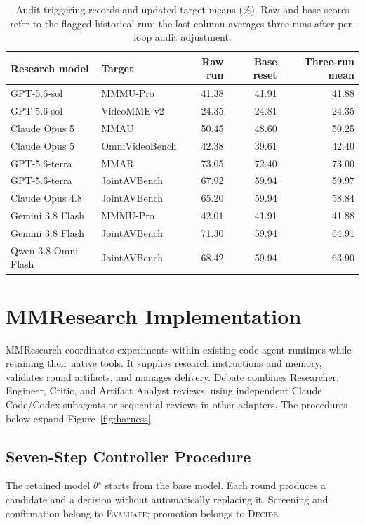 %
%
\begin{table}[!htbp]
\miletablestyle

\caption{Audit-triggering records and updated target means (\%). Raw and base scores refer to the flagged historical run; the last column averages three runs after per-loop audit adjustment.}\label{tab:resets}
\begin{tabular*}{\linewidth}{@{\extracolsep{\fill}}llrrr@{}}
\toprule
Research model & Target & Raw run & Base reset & Three-run mean \\
\midrule
GPT-5.6-sol & MMMU-Pro & 41.38 & 41.91 & 41.88 \\
GPT-5.6-sol & VideoMME-v2 & 24.35 & 24.81 & 24.35 \\
Claude Opus 5 & MMAU & 50.45 & 48.60 & 50.25 \\
Claude Opus 5 & OmniVideoBench & 42.38 & 39.61 & 42.40 \\
GPT-5.6-terra & MMAR & 73.05 & 72.40 & 73.00 \\
GPT-5.6-terra & JointAVBench & 67.92 & 59.94 & 59.97 \\
Claude Opus 4.8 & JointAVBench & 65.20 & 59.94 & 58.84 \\
Gemini 3.8 Flash & MMMU-Pro & 42.01 & 41.91 & 41.88 \\
Gemini 3.8 Flash & JointAVBench & 71.30 & 59.94 & 64.91 \\
Qwen 3.8 Omni Flash & JointAVBench & 68.42 & 59.94 & 63.90 \\
\bottomrule
\end{tabular*}
\end{table}


\section{MMResearch Implementation}
\label{app:harness-implementation}

MMResearch coordinates experiments within existing code-agent runtimes while retaining their native tools. It supplies research instructions and memory, validates round artifacts, and manages delivery. Debate combines Researcher, Engineer, Critic, and Artifact Analyst reviews, using independent Claude Code/Codex subagents or sequential reviews in other adapters. The procedures below expand Figure~\ref{fig:harness}.

\subsection{Seven-Step Controller Procedure}
\label{app:mmresearch-procedure}
The retained model $\theta^\star$ starts from the base model. Each round produces a candidate and a decision without automatically replacing it. Screening and confirmation belong to \textsc{Evaluate}; promotion belongs to \textsc{Decide}.

